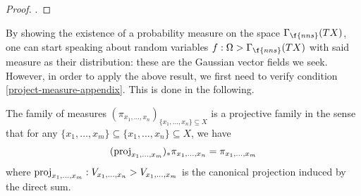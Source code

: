 \begin{proof}
	\textcite[Theorem 2.4.3]{tao11}.
\end{proof}

By showing the existence of a probability measure on the space $\Gamma_{\f{nns}}(TX)$, one can start speaking about random variables $f : \Omega \-> \Gamma_{\f{nns}}(TX)$ with said measure as their distribution: these are the Gaussian vector fields we seek.
However, in order to apply the above result, we first need to verify condition \eqref{project-measure-appendix}.
This is done in the following.

\begin{proposition} \label{prop:projective}
	The family of measures $(\pi_{x_1,\ldots,x_n})_{\{x_1,\ldots,x_n\}\subseteq X}$ is a projective family in the sense that for any $\{x_1,\ldots,x_m\} \subseteq \{x_1,\ldots,x_n\} \subseteq X$, we have \[ (\operatorname{proj}_{x_1,\ldots,x_m})_* \pi_{x_1,\ldots,x_n} = \pi_{x_1,\ldots,x_m} \] where $\operatorname{proj}_{x_1,\ldots,x_m} : V_{x_1,\ldots,x_n} \-> V_{x_1,\ldots,x_m}$ is the canonical projection induced by the direct sum.
\end{proposition}

